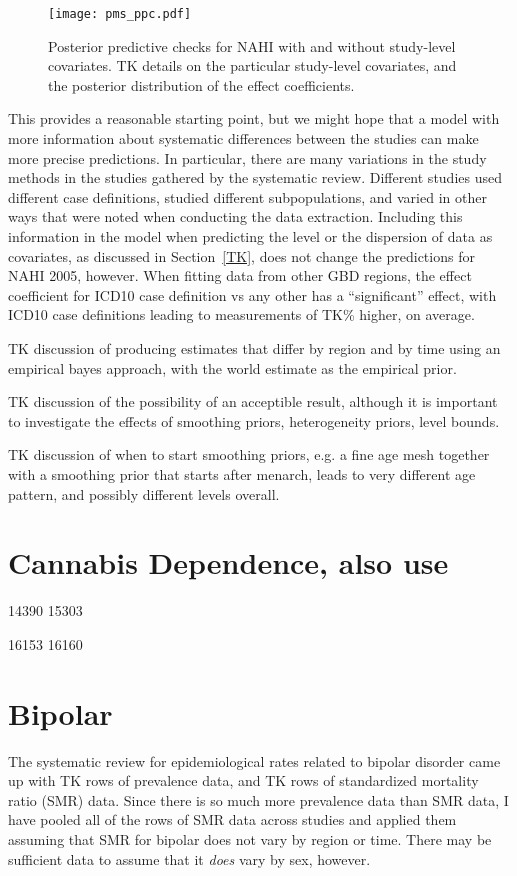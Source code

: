 \begin{figure}
\begin{center}
\texttt{[image: pms\_ppc.pdf]}
\end{center}
\caption{Posterior predictive checks for NAHI with and without
  study-level covariates. TK details on the particular study-level covariates, and the posterior distribution of the effect coefficients.}
\label{pms_ppc}
\end{figure}

This provides a reasonable starting point, but we might hope that a
model with more information about systematic differences between the
studies can make more precise predictions.  In particular, there are
many variations in the study methods in the studies gathered by the
systematic review.  Different studies used different case definitions,
studied different subpopulations, and varied in other ways that were
noted when conducting the data extraction.  Including this information
in the model when predicting the level or the dispersion of data as
covariates, as discussed in Section~\ref{TK}, does not change the
predictions for NAHI 2005, however.  When fitting data from other GBD
regions, the effect coefficient for ICD10 case definition vs any other
has a ``significant'' effect, with ICD10 case definitions leading to
measurements of TK\% higher, on average.

TK discussion of producing estimates that differ by region and  by time
using an empirical bayes approach, with the world estimate as the
empirical prior.

TK discussion of the possibility of an acceptible result, although it
is important to investigate the effects of smoothing priors,
heterogeneity priors, level bounds.

TK discussion of when to start smoothing priors, e.g. a fine age mesh
together with a smoothing prior that starts after menarch, leads to
very different age pattern, and possibly different levels overall.


\section{Cannabis Dependence, also use}
14390 15303 

16153 16160 

\section{Bipolar}
The systematic review for epidemiological rates related to bipolar
disorder came up with TK rows of prevalence data, and TK rows of
standardized mortality ratio (SMR) data.  Since there is so much more
prevalence data than SMR data, I have pooled all of the rows of SMR
data across studies and applied them assuming that SMR for bipolar
does not vary by region or time.  There may be sufficient data to assume
that it \emph{does} vary by sex, however. 


